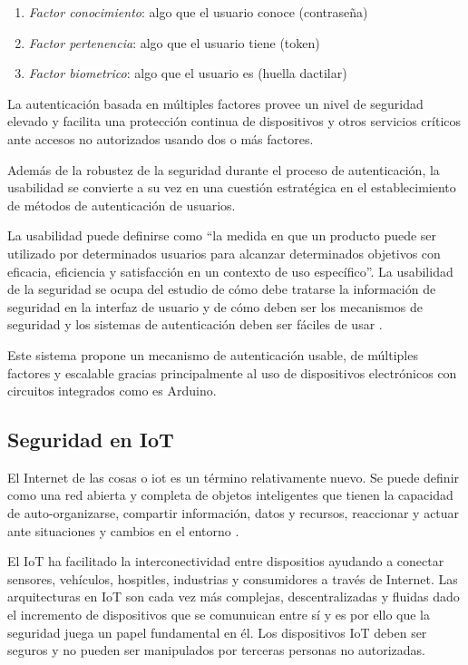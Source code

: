 \begin{enumerate}
    \item \textit{Factor conocimiento}: algo que el usuario conoce (contraseña)
    \item \textit{Factor pertenencia}: algo que el usuario tiene (token)
    \item \textit{Factor biometrico}: algo que el usuario es (huella dactilar) 
\end{enumerate}

La autenticación basada en múltiples factores provee un nivel de seguridad elevado y facilita una protección continua de 
dispositivos y otros servicios críticos ante accesos no autorizados usando dos o más factores.

Además de la robustez de la seguridad durante el proceso de autenticación, la usabilidad se convierte a su vez en una cuestión 
estratégica en el establecimiento de métodos de autenticación de  usuarios.

La usabilidad puede definirse como ``la medida en que un producto puede ser utilizado por determinados usuarios para alcanzar 
determinados objetivos con eficacia, eficiencia y satisfacción en un contexto de uso específico''. La usabilidad de la seguridad se 
ocupa del estudio de cómo debe tratarse la información de seguridad en la interfaz de usuario y de cómo deben ser los mecanismos 
de seguridad y los sistemas de autenticación deben ser fáciles de usar \cite{braz2006security}.

Este sistema \cite{multipauthpaper} propone un mecanismo de autenticación usable, de múltiples factores y escalable gracias 
principalmente al uso de dispositivos electrónicos con circuitos integrados como es Arduino.

\subsection{Seguridad en IoT}

El Internet de las cosas o \acrfull{iot} es un término relativamente nuevo. Se puede definir como una red abierta y completa de 
objetos inteligentes que tienen la capacidad de auto-organizarse, compartir información, datos y recursos, reaccionar y actuar 
ante situaciones y cambios en el entorno \cite{madakam2015internet}. 

El IoT ha facilitado la interconectividad entre dispositios ayudando a conectar sensores, vehículos, hospitles, industrias y 
consumidores a través de Internet. Las arquitecturas en IoT son cada vez más complejas, descentralizadas y fluidas dado el incremento de dispositivos que se 
comunuican entre sí y es por ello que la seguridad juega un papel fundamental en él. Los dispositivos IoT deben ser seguros y no 
pueden ser manipulados por terceras personas no autorizadas. 

